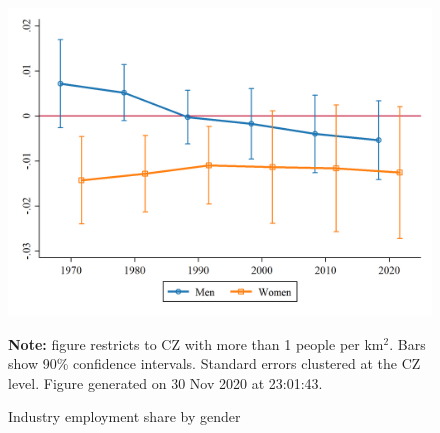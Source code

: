 \begin{figure}[!h]
\centering
\caption{Industry employment share by gender}
\label{figure:ind_gender_shares}
\includegraphics[width=1\textwidth]{../2_analysis/output/figures/gender_ind_empshares}
\par \begin{minipage}[h]{\textwidth}{\tiny\textbf{Note:} figure restricts to CZ with more than 1 people per km$^2$. Bars show 90\% confidence intervals. Standard errors clustered at the CZ level. Figure generated on 30 Nov 2020 at 23:01:43.}\end{minipage}
\end{figure}
